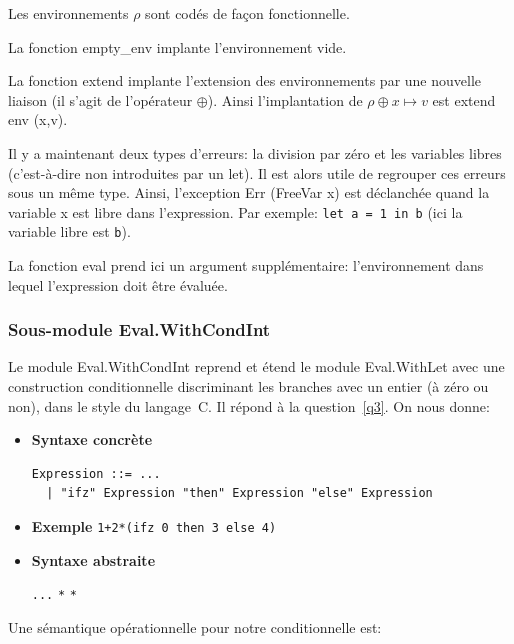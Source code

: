 \documentclass[a4paper,11pt]{article}
\newcommand{\ibullet}{\item[$\bullet$]}
\begin{document}
Les environnements $\rho$ sont codés de façon fonctionnelle.

La fonction \textsf{empty\_env} implante l'environnement vide.

La fonction \textsf{extend} implante l'extension des environnements
par une nouvelle liaison (il s'agit de l'opérateur $\oplus$). Ainsi
l'implantation de $\rho \oplus x \mapsto v$ est \textsf{extend env
  (x,v)}.

Il y a maintenant deux types d'erreurs: la division par zéro et les
variables libres (c'est-à-dire non introduites par un
\textsf{let}). Il est alors utile de regrouper ces erreurs sous un
même type. Ainsi, l'exception \textsf{Err (FreeVar x)} est déclanchée
quand la variable \textsf{x} est libre dans l'expression. Par exemple:
\texttt{let a = 1 in b} (ici la variable libre est \texttt{b}).

La fonction \textsf{eval} prend ici un argument supplémentaire:
l'environ\-nement dans lequel l'expression doit être évaluée.


\subsubsection{Sous-module \textsf{Eval.WithCondInt}}
\label{Eval.WithCondInt}

Le module \textsf{Eval.WithCondInt} reprend et étend le module
\textsf{Eval.WithLet} avec une construction conditionnelle
discriminant les branches avec un entier (à zéro ou non), dans le
style du langage~C. Il répond à la question~\ref{q3}. On nous donne:

\begin{itemize}

    \ibullet \textbf{Syntaxe concrète}
  {\small
   \begin{verbatim}
Expression ::= ...
  | "ifz" Expression "then" Expression "else" Expression
   \end{verbatim}
}

  \vspace*{-15pt}

  \ibullet \textbf{Exemple} \qquad \texttt{1+2*(ifz 0 then 3
  else 4)}

  \ibullet \textbf{Syntaxe abstraite}

    \equal{} \texttt{...} \vbar{} 
    \texttt{*}  \texttt{*} 

\end{itemize}

  \noindent Une sémantique opérationnelle pour notre conditionnelle est:
\end{document}
